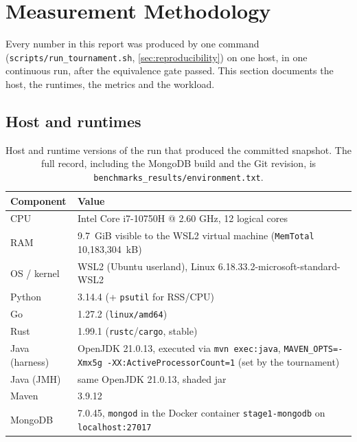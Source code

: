 \section{Measurement Methodology}
\label{sec:methodology}

Every number in this report was produced by one command
(\texttt{scripts/run\_tournament.sh}, \cref{sec:reproducibility}) on one
host, in one continuous run, after the equivalence gate passed. This section
documents the host, the runtimes, the metrics and the workload.

\subsection{Host and runtimes}
\label{sec:host}

\begin{table}[htbp]
    \centering
    \small
    \caption{Host and runtime versions of the run that produced the committed
    snapshot. The full record, including the MongoDB build and the Git
    revision, is \texttt{benchmarks\_results/environment.txt}.}
    \label{tab:host}
    \begin{tabular}{@{}lp{12cm}@{}}
        \toprule
        Component & Value \\
        \midrule
        CPU & Intel Core i7-10750H @ 2.60 GHz, 12 logical cores \\
        RAM & 9.7~GiB visible to the WSL2 virtual machine
        (\texttt{MemTotal} 10{,}183{,}304~kB) \\
        OS / kernel & WSL2 (Ubuntu userland), Linux 6.18.33.2-microsoft-standard-WSL2 \\
        Python & 3.14.4 (+ \texttt{psutil} for RSS/CPU) \\
        Go & 1.27.2 (\texttt{linux/amd64}) \\
        Rust & 1.99.1 (\texttt{rustc}/\texttt{cargo}, stable) \\
        Java (harness) & OpenJDK 21.0.13, executed via \texttt{mvn exec:java},
        \texttt{MAVEN\_OPTS=-Xmx5g -XX:ActiveProcessorCount=1} (set by the
        tournament) \\
        Java (JMH) & same OpenJDK 21.0.13, shaded jar \\
        Maven & 3.9.12 \\
        MongoDB & 7.0.45, \texttt{mongod} in the Docker container
        \texttt{stage1-mongodb} on \texttt{localhost:27017} \\
        \bottomrule
    \end{tabular}
\end{table}

